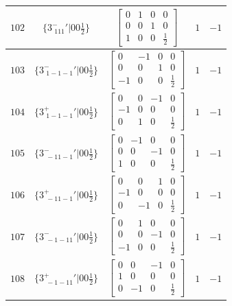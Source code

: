 \documentclass[fleqn,8pt]{jsarticle}
\begin{document}
\begin{longtable}{ccccc}
$ 102 $ & $ \{3^{-}_{\,\,111}{}'|0 0 \frac{1}{2}\} $ & $ \begin{bmatrix} 0 & 1 & 0 & 0 \\ 0 & 0 & 1 & 0 \\ 1 & 0 & 0 & \frac{1}{2} \end{bmatrix} $ & $ 1 $ & $ -1 $ \\ \hline
$ 103 $ & $ \{3^{-}_{\,\,1-1-1}{}'|0 0 \frac{1}{2}\} $ & $ \begin{bmatrix} 0 & -1 & 0 & 0 \\ 0 & 0 & 1 & 0 \\ -1 & 0 & 0 & \frac{1}{2} \end{bmatrix} $ & $ 1 $ & $ -1 $ \\ \hline
$ 104 $ & $ \{3^{+}_{\,\,1-1-1}{}'|0 0 \frac{1}{2}\} $ & $ \begin{bmatrix} 0 & 0 & -1 & 0 \\ -1 & 0 & 0 & 0 \\ 0 & 1 & 0 & \frac{1}{2} \end{bmatrix} $ & $ 1 $ & $ -1 $ \\ \hline
$ 105 $ & $ \{3^{-}_{\,\,-11-1}{}'|0 0 \frac{1}{2}\} $ & $ \begin{bmatrix} 0 & -1 & 0 & 0 \\ 0 & 0 & -1 & 0 \\ 1 & 0 & 0 & \frac{1}{2} \end{bmatrix} $ & $ 1 $ & $ -1 $ \\ \hline
$ 106 $ & $ \{3^{+}_{\,\,-11-1}{}'|0 0 \frac{1}{2}\} $ & $ \begin{bmatrix} 0 & 0 & 1 & 0 \\ -1 & 0 & 0 & 0 \\ 0 & -1 & 0 & \frac{1}{2} \end{bmatrix} $ & $ 1 $ & $ -1 $ \\ \hline
$ 107 $ & $ \{3^{-}_{\,\,-1-11}{}'|0 0 \frac{1}{2}\} $ & $ \begin{bmatrix} 0 & 1 & 0 & 0 \\ 0 & 0 & -1 & 0 \\ -1 & 0 & 0 & \frac{1}{2} \end{bmatrix} $ & $ 1 $ & $ -1 $ \\ \hline
$ 108 $ & $ \{3^{+}_{\,\,-1-11}{}'|0 0 \frac{1}{2}\} $ & $ \begin{bmatrix} 0 & 0 & -1 & 0 \\ 1 & 0 & 0 & 0 \\ 0 & -1 & 0 & \frac{1}{2} \end{bmatrix} $ & $ 1 $ & $ -1 $ \\ \hline

\end{longtable}
\end{document}
